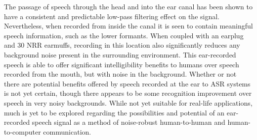 The passage of speech through the head and into the ear canal has been shown to have a consistent and predictable low-pass filtering effect on the signal.  Nevertheless, when recorded from inside the canal it is seen to contain meaningful speech information, such as the lower formants.  When coupled with an earplug and 30 NRR earmuffs, recording in this location also significantly reduces any background noise present in the surrounding environment.  This ear-recorded speech is able to offer significant intelligibility benefits to humans over speech recorded from the mouth, but with noise in the background.  Whether or not there are potential benefits offered by speech recorded at the ear to ASR systems is not yet certain, though there appears to be some recognition improvement over speech in very noisy backgrounds. While not yet suitable for real-life applications, much is yet to be explored regarding the possibilities and potential of an ear-recorded speech signal as a method of noise-robust human-to-human and human-to-computer communication.






